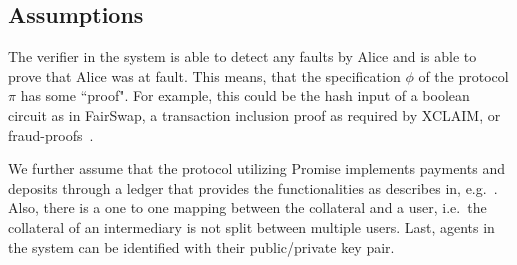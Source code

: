 \documentclass[runningheads]{llncs}
\newcommand{\sys}{Promise\xspace}
\begin{document}
\subsection{Assumptions}

The verifier in the system is able to detect any faults by Alice and is able to prove that Alice was at fault.
This means, that the specification $\phi$ of the protocol $\pi$ has some ``proof".
For example, this could be the hash input of a boolean circuit as in FairSwap, a transaction inclusion proof as required by XCLAIM, or fraud-proofs~\cite{Al-Bassam2018}.

We further assume that the protocol utilizing \sys implements payments and deposits through a ledger that provides the functionalities as describes in, e.g.~\cite{garay2016bitcoin}. 
Also, there is a one to one mapping between the collateral and a user, i.e.\ the collateral of an intermediary is not split between multiple users.
Last, agents in the system can be identified with their public/private key pair.

\end{document}
